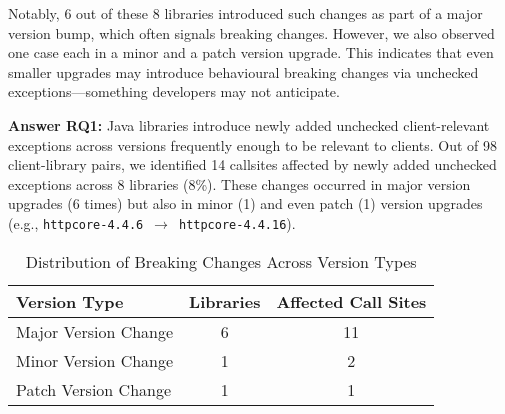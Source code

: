 Notably, 6 out of these 8 libraries introduced such changes as part of a major version bump, which often signals breaking changes. However, we also observed one case each in a minor and a patch version upgrade. This indicates that even smaller upgrades may introduce behavioural breaking changes via unchecked exceptions—something developers may not anticipate.

\vspace{1em}
\begin{tcolorbox}[colback=gray!10, colframe=black]
\textbf{Answer RQ1:} Java libraries introduce newly added unchecked client-relevant exceptions across versions frequently enough to be relevant to clients. Out of 98 client-library pairs, we identified 14 callsites affected by newly added unchecked exceptions across 8 libraries (8\%). These changes occurred in major version upgrades (6 times) but also in minor (1) and even patch (1) version upgrades (e.g., \texttt{httpcore-4.4.6}~$\rightarrow$~\texttt{httpcore-4.4.16}).
\end{tcolorbox}
\vspace{1em}

\begin{table}[h]
\centering
\caption{Distribution of Breaking Changes Across Version Types}
\label{tab:version-distribution}
\begin{tabular}{lcc}
\toprule
\textbf{Version Type} & \textbf{Libraries} & \textbf{Affected Call Sites} \\
\midrule
Major Version Change & 6 & 11 \\
Minor Version Change & 1 & 2 \\
Patch Version Change & 1 & 1 \\
\bottomrule
\end{tabular}
\end{table}

